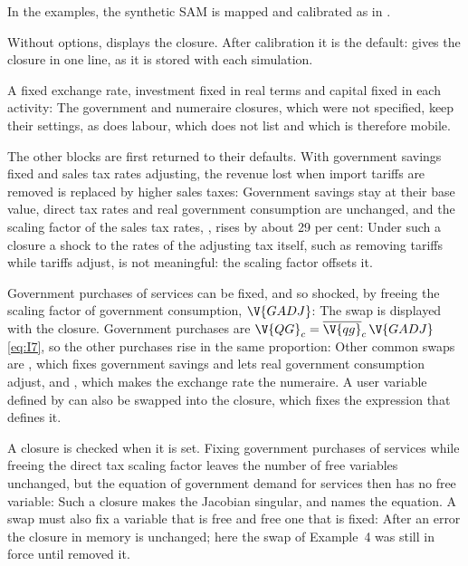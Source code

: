 In the examples, the synthetic SAM is mapped and calibrated as in
.


Without options,  displays the closure. After calibration it
is the default:
 gives the closure in one line, as it is stored with each
simulation.


A fixed exchange rate, investment fixed in real terms and capital fixed in
each activity:
The government and numeraire closures, which were not specified, keep their
settings, as does labour, which  does not list and which is
therefore mobile.


The other blocks are first returned to their defaults. With government savings
fixed and sales tax rates adjusting, the revenue lost when import tariffs are
removed is replaced by higher sales taxes:
Government savings stay at their base value, direct tax rates and real
government consumption are unchanged, and the scaling factor of the sales tax
rates, , rises by about 29 per cent:
Under such a closure a shock to the rates of the adjusting tax itself, such as
removing tariffs while tariffs adjust, is not meaningful: the scaling factor
offsets it.


Government purchases of services can be fixed, and so shocked, by freeing the
scaling factor of government consumption, $\V{GADJ}$:
The swap is displayed with the closure. Government purchases are
$\V{QG}_c = \overline{\V{qg}}_c\,\V{GADJ}$ \eqref{eq:I7}, so the other purchases
rise in the same proportion:
Other common swaps are , which fixes government savings
and lets real government consumption adjust, and , which
makes the exchange rate the numeraire. A user variable defined by
 can also be swapped into the closure, which fixes the
expression that defines it.


A closure is checked when it is set. Fixing government purchases of services
while freeing the direct tax scaling factor leaves the number of free variables
unchanged, but the equation of government demand for services then has no free
variable:
Such a closure makes the Jacobian singular, and  names the
equation. A swap must also fix a variable that is free and free one that is
fixed:
After an error the closure in memory is unchanged; here the swap of
Example~4 was still in force until  removed it.

